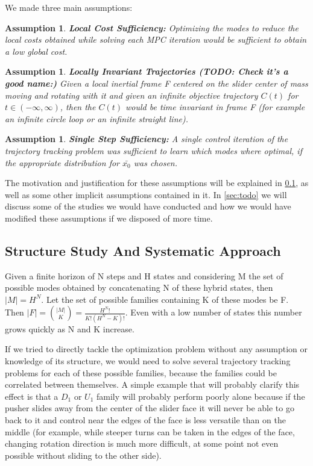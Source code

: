 \documentclass[12,twoside]{TFG-GM}
\newtheorem{assumption}[theorem]{Assumption}
\theoremstyle{definition}
\theoremstyle{remark}
\newcommand*\diff[1]{\bar{#1}}
\begin{document}
We made three main assumptions:
\begin{assumption} \label{ass:localcost}
\textbf{Local Cost Sufficiency:} Optimizing the modes to reduce the local costs obtained while solving each MPC iteration would be sufficient to obtain a low global cost.
\end{assumption}
\begin{assumption} \label{ass:localinv}
\textbf{Locally Invariant Trajectories (TODO: Check it's a good name:)} Given a local inertial frame F centered on the slider center of mass moving and rotating with it and given an infinite objective trajectory $C(t)$ for $t \in (-\infty, \infty)$, then the $C(t)$ would be time invariant in frame F (for example an infinite circle loop or an infinite straight line).
\end{assumption}
\begin{assumption} \label{ass:singlestep}
\textbf{Single Step Sufficiency:} A single control iteration of the trajectory tracking problem was sufficient to learn which modes where optimal, if the appropriate distribution for $\diff{x_0}$ was chosen.
\end{assumption} 

The motivation and justification for these assumptions will be explained in \ref{subsec:structure}, as well as some other implicit assumptions contained in it. In \ref{sec:todo} we will discuss some of the studies we would have conducted and how we would have modified these assumptions if we disposed of more time.

\subsection{Structure Study And Systematic Approach}
\label{subsec:structure}
Given a finite horizon of N steps and H states and considering M the set of possible modes obtained by concatenating N of these hybrid states, then $|M| = H^N$. Let the set of possible families containing K of these modes be F. Then $|F| = \binom {|M|}{K} = \frac{H^{N}!}{K!(H^N-K)!}$. Even with a low number of states this number grows quickly as N and K increase.

If we tried to directly tackle the optimization problem without any assumption or knowledge of its structure, we would need to solve several trajectory tracking problems for each of these possible families, because the families could be correlated between themselves. A simple example that will probably clarify this effect is that a $D_1$ or $U_1$ family will probably perform poorly alone because if the pusher slides away from the center of the slider face it will never be able to go back to it and control near the edges of the face is less versatile than on the middle (for example, while steeper turns can be taken in the edges of the face, changing rotation direction is much more difficult, at some point not even possible without sliding to the other side).
\end{document}
